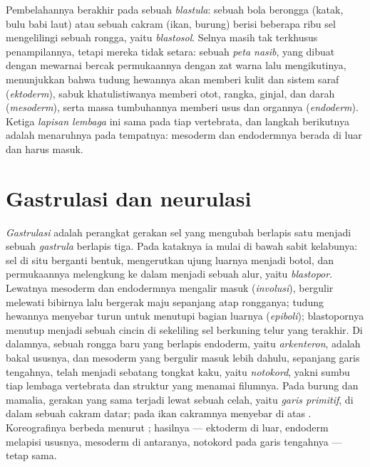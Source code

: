 \begin{definition}[Blastula]\label{def:b2:vertebrate-development:blastula}
Pembelahannya berakhir pada sebuah \emph{blastula}: sebuah bola
berongga (katak, bulu babi laut) atau sebuah cakram (ikan, burung)
berisi beberapa ribu sel mengelilingi sebuah rongga, yaitu
\emph{blastosol}. Selnya masih tak terkhusus penampilannya, tetapi
mereka tidak setara: sebuah \emph{peta nasib}, yang dibuat dengan
mewarnai bercak permukaannya dengan zat warna lalu mengikutinya,
menunjukkan bahwa tudung hewannya akan memberi kulit dan sistem saraf
(\emph{ektoderm}), sabuk khatulistiwanya memberi otot, rangka, ginjal,
dan darah (\emph{mesoderm}), serta massa tumbuhannya memberi usus dan
organnya (\emph{endoderm}). Ketiga \emph{lapisan lembaga} ini sama pada
tiap vertebrata, dan langkah berikutnya adalah menaruhnya pada
tempatnya: mesoderm dan endodermnya berada di luar dan harus masuk.
\end{definition}

\section{Gastrulasi dan neurulasi}

\begin{proposition}[Gastrulasi]\label{prop:b2:vertebrate-development:gastrulation}
\emph{Gastrulasi} adalah perangkat gerakan sel yang mengubah 
berlapis satu menjadi sebuah \emph{gastrula} berlapis tiga. Pada
kataknya ia mulai di bawah sabit kelabunya: sel di situ berganti
bentuk, mengerutkan ujung luarnya menjadi botol, dan permukaannya
melengkung ke dalam menjadi sebuah alur, yaitu \emph{blastopor}.
Lewatnya mesoderm dan endodermnya mengalir masuk (\emph{involusi}),
bergulir melewati bibirnya lalu bergerak maju sepanjang atap rongganya;
tudung hewannya menyebar turun untuk menutupi bagian luarnya
(\emph{epiboli}); blastopornya menutup menjadi sebuah cincin di
sekeliling sel berkuning telur yang terakhir. Di dalamnya, sebuah
rongga baru yang berlapis endoderm, yaitu \emph{arkenteron}, adalah
bakal ususnya, dan mesoderm yang bergulir masuk lebih dahulu, sepanjang
garis tengahnya, telah menjadi sebatang tongkat kaku, yaitu
\emph{notokord}, yakni sumbu tiap lembaga vertebrata dan struktur yang
menamai filumnya. Pada burung dan mamalia, gerakan yang sama terjadi
lewat sebuah celah, yaitu \emph{garis primitif}, di dalam sebuah cakram
datar; pada ikan cakramnya menyebar di atas .
Koreografinya berbeda menurut ; hasilnya --- ektoderm di
luar, endoderm melapisi ususnya, mesoderm di antaranya, notokord pada
garis tengahnya --- tetap sama.
\end{proposition}

